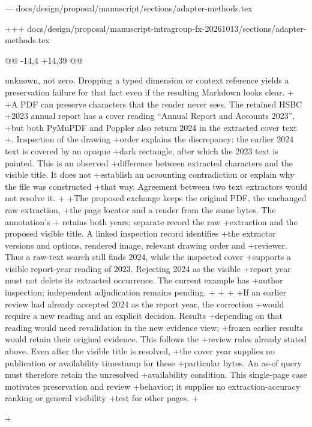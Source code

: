 --- docs/design/proposal/manuscript/sections/adapter-methods.tex

+++ docs/design/proposal/manuscript-intragroup-fx-20261013/sections/adapter-methods.tex

@@ -14,4 +14,39 @@

 unknown, not zero. Dropping a typed dimension or context reference yields a
 preservation failure for that fact even if the resulting Markdown looks clear.
+
+A PDF can preserve characters that the reader never sees. The retained HSBC
+2023 annual report has a cover reading ``Annual Report and Accounts 2023'',
+but both PyMuPDF and Poppler also return 2024 in the extracted cover text
+\citep[cover, physical PDF p.~1]{hsbc2023annualcover}. Inspection of the drawing
+order explains the discrepancy: the earlier 2024 text is covered by an opaque
+dark rectangle, after which the 2023 text is painted. This is an observed
+difference between extracted characters and the visible title. It does not
+establish an accounting contradiction or explain why the file was constructed
+that way. Agreement between two text extractors would not resolve it.
+
+The proposed exchange keeps the original PDF, the unchanged raw extraction,
+the page locator and a render from the same bytes. The annotation's
+ retains both years; separate  record the raw
+extraction and the proposed visible title. A linked inspection record identifies
+the extractor versions and options, rendered image, relevant drawing order and
+reviewer. Thus a raw-text search still finds 2024, while the inspected cover
+supports a visible report-year reading of 2023. Rejecting 2024 as the visible
+report year must not delete its extracted occurrence. The current example has
+author inspection; independent adjudication remains pending.
+
+\begingroup
+
+If an earlier review had already accepted 2024 as the report year, the correction
+would require a new reading and an explicit  decision. Results
+depending on that reading would need revalidation in the new evidence view;
+frozen earlier results would retain their original evidence. This follows the
+review rules already stated above. Even after the visible title is resolved,
+the cover year supplies no publication or availability timestamp for these
+particular bytes. An as-of query must therefore retain the unresolved
+availability condition. This single-page case motivates preservation and review
+behavior; it supplies no extraction-accuracy ranking or general visibility
+test for other pages.
+\par\endgroup
+
 
